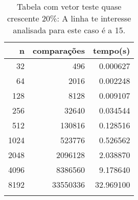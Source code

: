 \begin{table}[ht]
\centering
\begin{tabular}{rrr} \toprule
        n &    comparações &       tempo(s) \\ \midrule
      32  &            496 &      0.000627 \\
      64  &           2016 &      0.002248 \\
     128  &           8128 &      0.009107 \\
     256  &          32640 &      0.034544 \\
     512  &         130816 &      0.128516 \\
    1024  &         523776 &      0.526562 \\
    2048  &        2096128 &      2.038870 \\
    4096  &        8386560 &      9.178640 \\
    8192  &       33550336 &     32.969100 \\
\bottomrule\addlinespace
\end{tabular}
\caption{Tabela com vetor teste quase crescente 20\%: A linha te interesse analisada para este caso é a 15.}
\label{tab:selectionsortQuaseCresc20}
\end{table}
